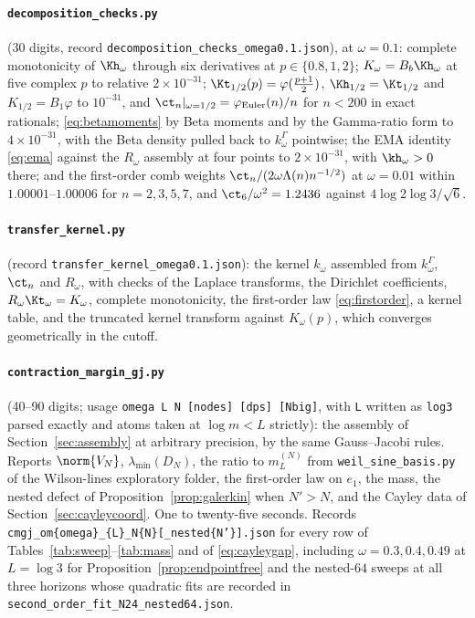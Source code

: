 \paragraph{\texttt{decomposition\_checks.py}} (30 digits, record
\texttt{decomposition\_checks\_omega0.1.json}), at $\omega=0.1$: complete
monotonicity of $\Kh_\omega$ through six derivatives at $p\in\{0.8,1,2\}$;
$K_\omega=B_b\Kh_\omega$ at five complex $p$ to relative $2\times10^{-31}$;
$\Kt_{1/2}(p)=\varphi(\frac{p+1}2)$, $\Kh_{1/2}=\Kt_{1/2}$ and $K_{1/2}=B_1\varphi$
to $10^{-31}$, and $\ct_n|_{\omega=1/2}=\varphi_{\mathrm{Euler}}(n)/n$ for
$n<200$ in exact rationals; \eqref{eq:betamoments} by Beta moments and by the
Gamma-ratio form to $4\times10^{-31}$, with the Beta density pulled back to
$k^\Gamma_\omega$ pointwise; the EMA identity \eqref{eq:ema} against the
$R_\omega$ assembly at four points to $2\times10^{-31}$, with $\kh_\omega>0$
there; and the first-order comb weights $\ct_n/(2\omega\Lambda(n)n^{-1/2})$ at
$\omega=0.01$ within $1.00001$--$1.00006$ for $n=2,3,5,7$, and
$\ct_6/\omega^2=1.2436$ against $4\log2\log3/\sqrt6$.

\paragraph{\texttt{transfer\_kernel.py}} (record
\texttt{transfer\_kernel\_omega0.1.json}): the kernel $k_\omega$ assembled from
$k^\Gamma_\omega$, $\ct_n$ and $R_\omega$, with checks of the Laplace
transforms, the Dirichlet coefficients, $R_\omega\Kt_\omega=K_\omega$, complete
monotonicity, the first-order law \eqref{eq:firstorder}, a kernel table, and
the truncated kernel transform against $K_\omega(p)$, which converges
geometrically in the cutoff.

\paragraph{\texttt{contraction\_margin\_gj.py}} (40--90 digits; usage
\texttt{omega L N [nodes] [dps] [Nbig]}, with \texttt{L} written as
\texttt{log3} parsed exactly and atoms taken at $\log m<L$ strictly): the
assembly of Section~\ref{sec:assembly} at arbitrary precision, by the same
Gauss--Jacobi rules. Reports $\norm{V_N}$, $\lambda_{\min}(D_N)$, the ratio to
$m_L^{(N)}$ from \texttt{weil\_sine\_basis.py} of the Wilson-lines exploratory
folder, the first-order law on $e_1$, the mass, the nested defect of
Proposition~\ref{prop:galerkin} when $N'>N$, and the Cayley data of
Section~\ref{sec:cayleycoord}. One to twenty-five seconds. Records
\texttt{cmgj\_om\{omega\}\_\{L\}\_N\{N\}[\_nested\{N'\}].json} for every row of
Tables~\ref{tab:sweep}--\ref{tab:mass} and of \eqref{eq:cayleygap}, including
$\omega=0.3,0.4,0.49$ at $L=\log3$ for Proposition~\ref{prop:endpointfree} and
the nested-$64$ sweeps at all three horizons whose quadratic fits are recorded in
\texttt{second\_order\_fit\_\allowbreak N24\_nested64.json}.

